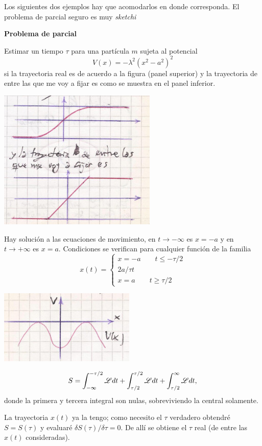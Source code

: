 \documentclass[10pt,oneside]{CBFT_book}
\begin{document}
Los siguientes dos ejemplos hay que acomodarlos en donde corresponda. El problema de parcial seguro es muy {\it sketchi}
\begin{ejemplo}{\bf Problema de parcial}
 
Estimar un tiempo $\tau$  para una partícula $m$ sujeta al potencial
\[
	V(x) = - \lambda^2 ( x^2 - a^2)^2
\]
si la trayectoria real es de acuerdo a la figura (panel superior) y la trayectoria de entre las que me voy a fijar es como se 
muestra en el panel inferior.

\includegraphics[scale = 0.4]{images/fig_mc_problema_parcial_tray1.jpg}	 

Hay solución a las ecuaciones de movimiento, en $t \to -\infty$ es $x=-a$ y en $t \to +\infty$ es $x=a$.
Condiciones se verifican para cualquier función de la familia
\[
	x( t) = \begin{cases}
		x = -a \qquad t \leq -\tau/2 \\
		2a/\tau t \\
		x = a \qquad t \geq \tau/2
	\end{cases}
\]

\includegraphics[scale = 0.4]{images/fig_mc_problema_parcial_tray2.jpg}	 

\[
	S = \int_{-\infty}^{-\tau/2} \mathscr{L} dt + \int_{\tau/2}^{\tau/2} \mathscr{L} dt + \int_{\tau/2}^{\infty} \mathscr{L} dt,
\]
donde la primera y tercera integral son nulas, sobreviviendo la central solamente.

La trayectoria $x(t)$ ya la tengo; como necesito el $\tau$ verdadero obtendré $S=S(\tau)$ y evaluaré $\delta S(\tau)/\delta \tau 
= 0 $.
De allí se obtiene el $\tau$ real (de entre las $x(t)$ consideradas).
\end{ejemplo}
\end{document}
